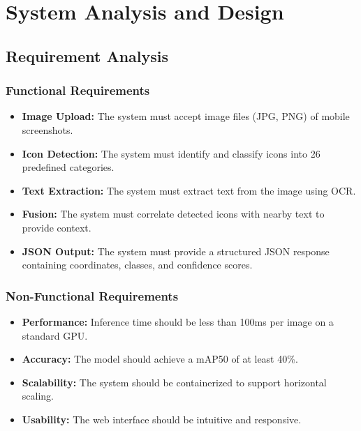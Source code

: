 \documentclass[11pt,a4paper]{report}
\begin{document}
\chapter{System Analysis and Design}

\section{Requirement Analysis}

\subsection{Functional Requirements}
\begin{itemize}
    \item \textbf{Image Upload:} The system must accept image files (JPG, PNG) of mobile screenshots.
    \item \textbf{Icon Detection:} The system must identify and classify icons into 26 predefined categories.
    \item \textbf{Text Extraction:} The system must extract text from the image using OCR.
    \item \textbf{Fusion:} The system must correlate detected icons with nearby text to provide context.
    \item \textbf{JSON Output:} The system must provide a structured JSON response containing coordinates, classes, and confidence scores.
\end{itemize}

\subsection{Non-Functional Requirements}
\begin{itemize}
    \item \textbf{Performance:} Inference time should be less than 100ms per image on a standard GPU.
    \item \textbf{Accuracy:} The model should achieve a mAP50 of at least 40\%.
    \item \textbf{Scalability:} The system should be containerized to support horizontal scaling.
    \item \textbf{Usability:} The web interface should be intuitive and responsive.
\end{itemize}
\end{document}
